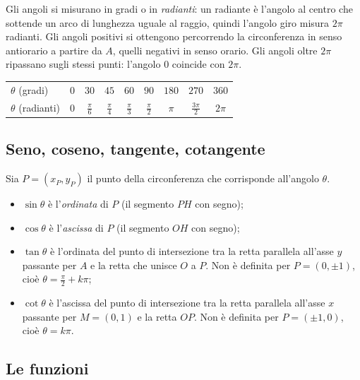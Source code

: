 \documentclass[11pt,a4paper]{article}
\begin{document}
Gli angoli si misurano in gradi o in \emph{radianti}: un radiante è l'angolo al centro che sottende un arco di lunghezza uguale al raggio, quindi l'angolo giro misura $2\pi$ radianti. Gli angoli positivi si ottengono percorrendo la circonferenza in senso antiorario a partire da $A$, quelli negativi in senso orario. Gli angoli oltre $2\pi$ ripassano sugli stessi punti: l'angolo $0$ coincide con $2\pi$.

\begin{center}
\renewcommand{\arraystretch}{1.2}
\begin{tabular}{@{}l|cccccccc@{}}
\toprule
$\theta$ (gradi) & $0$ & $30$ & $45$ & $60$ & $90$ & $180$ & $270$ & $360$ \\
$\theta$ (radianti) & $0$ & $\frac{\pi}{6}$ & $\frac{\pi}{4}$ & $\frac{\pi}{3}$ & $\frac{\pi}{2}$ & $\pi$ & $\frac{3\pi}{2}$ & $2\pi$ \\
\bottomrule
\end{tabular}
\end{center}

\subsection{Seno, coseno, tangente, cotangente}

Sia $P = (x_P, y_P)$ il punto della circonferenza che corrisponde all'angolo $\theta$.
\begin{itemize}
    \item $\sin\theta$ è l'\emph{ordinata} di $P$ (il segmento $PH$ con segno);
    \item $\cos\theta$ è l'\emph{ascissa} di $P$ (il segmento $OH$ con segno);
    \item $\tan\theta$ è l'ordinata del punto di intersezione tra la retta parallela all'asse $y$ passante per $A$ e la retta che unisce $O$ a $P$. Non è definita per $P = (0, \pm 1)$, cioè $\theta = \frac{\pi}{2} + k\pi$;
    \item $\cot\theta$ è l'ascissa del punto di intersezione tra la retta parallela all'asse $x$ passante per $M = (0, 1)$ e la retta $OP$. Non è definita per $P = (\pm 1, 0)$, cioè $\theta = k\pi$.
\end{itemize}

\subsection{Le funzioni}
\end{document}
